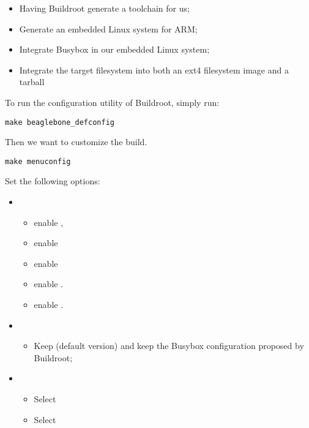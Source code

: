 \begin{itemize}
\item Having Buildroot generate a toolchain for us;
\item Generate an embedded Linux system for ARM;
\item Integrate Busybox in our embedded Linux system;
\item Integrate the target filesystem into both an ext4 filesystem
  image and a tarball
\end{itemize}

To run the configuration utility of Buildroot, simply run:

\begin{verbatim}
make beaglebone_defconfig
\end{verbatim}

Then we want to customize the build.

\begin{verbatim}
make menuconfig
\end{verbatim}

Set the following options:

\begin{itemize}
\item {}
  \begin{itemize}
  \item enable , 
  \item enable 
  \item enable 
  \item enable .
  \item enable .
  \end{itemize}
\item {}
  \begin{itemize}
  \item Keep  (default version) and keep the Busybox
    configuration proposed by Buildroot;
  \end{itemize}
\item {}
  \begin{itemize}
  \item Select 
  \item Select 
  \end{itemize}
\end{itemize}

